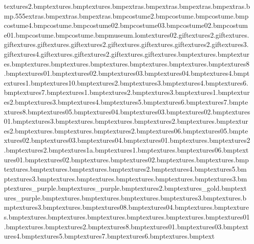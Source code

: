 textures\entryblue2.bmp textures\plugwall.bmp textures\bonepicture.bmp extras\polishertrailzmask.bmp extras\polishertrailstar.bmp extras\polishertrail.bmp extras\map.bmp.555 extras\wantedlogomagenta.bmp extras\wbflag.bmp extras\wbstar.bmp costume\earslined2.bmp costume\noseshine.bmp costume\muzzlestubble.bmp costume\tongueline4.bmp costume\ninjaeyebrow.bmp costume\ninjamuzzle02.bmp costume\ninjakatana03.bmp costume\ninjakatana02.bmp costume\ninjakatana01.bmp costume\ninjaeyetex.bmp costume\ninjatoes.bmp museum.lom textures\lavabubble02.gif textures\lightbulbflashing2.gif textures\lightbulbflashing.gif textures\paintingwarp.gif textures\sewerwater.gif textures\sewerwater2.gif textures\gears.gif textures\tvsnow.gif textures\tvsnow2.gif textures\tvmuseum3.gif textures\tvmuseum4.gif textures\tvmuseum.gif textures\tvmuseum2.gif textures\light.gif textures\geniebottle.bmp textures\mingvase.bmp textures\nativepot.bmp textures\necklace.bmp textures\orientalplate.bmp textures\ring.bmp textures\scroll.bmp textures\stonetablet.bmp textures\clothes8.bmp textures\coins01.bmp textures\coins02.bmp textures\coins03.bmp textures\coins04.bmp textures\cash4.bmp textures\clothes1.bmp textures\clothes10.bmp textures\clothes2.bmp textures\clothes3.bmp textures\clothes4.bmp textures\clothes6.bmp textures\clothes7.bmp textures\cash1.bmp textures\cash2.bmp textures\cash3.bmp textures\tvbits1.bmp textures\tvbits2.bmp textures\tvbits3.bmp textures\tvbits4.bmp textures\tvbits5.bmp textures\tvbits6.bmp textures\tvbits7.bmp textures\tvbits8.bmp textures\whackbit05.bmp textures\whackbit04.bmp textures\whackbit03.bmp textures\whackbit02.bmp textures\whackbit01.bmp textures\aquasandcas3.bmp textures\leaftree.bmp textures\plaquenut.bmp textures\stairail2.bmp textures\stairail.bmp textures\gratting2.bmp textures\plaquehotdog.bmp textures\vpaintplaque.bmp textures\locker2.bmp textures\sewerlower06.bmp textures\sewerlower05.bmp textures\sewerlower02.bmp textures\sewerlower03.bmp textures\sewerlower04.bmp textures\sewerlower01.bmp textures\entrance.bmp textures\tazwin2.bmp textures\hotdog2.bmp textures\hotdog1a.bmp textures\hotdog1.bmp textures\flash.bmp textures\anvil06.bmp textures\woodblock01.bmp textures\woodblock02.bmp textures\rocketbike.bmp textures\ribs02.bmp textures\nose.bmp textures\eye.bmp textures\tooth.bmp textures\spine.bmp textures\ribs.bmp textures\boot2.bmp textures\boot4.bmp textures\boot5.bmp textures\boot3.bmp textures\boot.bmp textures\marbwallarch.bmp textures\tazwantedback.bmp textures\tazwantedpaintings.bmp textures\locker3.bmp textures\liftdoorleft_purple.bmp textures\liftdoorright_purple.bmp textures\chess2.bmp textures\chess_gold.bmp textures\chess_purple.bmp textures\paintmanwdoor.bmp textures\hotdog.bmp textures\mixer.bmp textures\mixershine3.bmp textures\mixershine.bmp textures\skip3.bmp textures\trucktiretred.bmp textures\anvil08.bmp textures\anvil04.bmp textures\tableleg.bmp textures\sign.bmp textures\leafletcab.bmp textures\directionquestion.bmp textures\roadnarrows.bmp textures\arrowbend.bmp textures\plainsigndiamond.bmp textures\trough01.bmp textures\paintmang.bmp textures\rocketbike2.bmp textures\companel8.bmp textures\bigcraneside01.bmp textures\anvil03.bmp textures\companel4.bmp textures\companel5.bmp textures\companel7.bmp textures\compmont6.bmp textures\tempscroll.bmp text